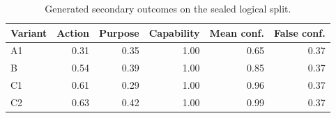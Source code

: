 \begin{table}[t]\centering\scriptsize
\caption{Generated secondary outcomes on the sealed logical split.}
\label{tab:generated-secondary-results}
\begin{tabular}{lrrrrr}\toprule
Variant & Action & Purpose & Capability & Mean conf. & False conf.\\\midrule
A1 & 0.31 & 0.35 & 1.00 & 0.65 & 0.37\\
B & 0.54 & 0.39 & 1.00 & 0.85 & 0.37\\
C1 & 0.61 & 0.29 & 1.00 & 0.96 & 0.37\\
C2 & 0.63 & 0.42 & 1.00 & 0.99 & 0.37\\
\bottomrule
\end{tabular}
\end{table}
